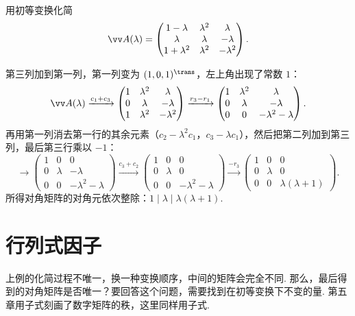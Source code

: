 	\begin{example}\label{eg:smithcalc}
		用初等变换化简
		\[\vv A(\lambda)=\begin{pmatrix}1-\lambda&\lambda^2&\lambda\\\lambda&\lambda&-\lambda\\1+\lambda^2&\lambda^2&-\lambda^2\end{pmatrix}.\]
	\end{example}
	\begin{solution}
		第三列加到第一列，第一列变为 $(1,0,1)^\trans$，左上角出现了常数 $1$：
		\[\vv A(\lambda)\xrightarrow{c_1+c_3}\begin{pmatrix}1&\lambda^2&\lambda\\0&\lambda&-\lambda\\1&\lambda^2&-\lambda^2\end{pmatrix}
		\xrightarrow{r_3-r_1}\begin{pmatrix}1&\lambda^2&\lambda\\0&\lambda&-\lambda\\0&0&-\lambda^2-\lambda\end{pmatrix}.\]
		再用第一列消去第一行的其余元素（$c_2-\lambda^2c_1$，$c_3-\lambda c_1$），然后把第二列加到第三列，最后第三行乘以 $-1$：
		\[\longrightarrow\begin{pmatrix}1&0&0\\0&\lambda&-\lambda\\0&0&-\lambda^2-\lambda\end{pmatrix}
		\xrightarrow{c_3+c_2}\begin{pmatrix}1&0&0\\0&\lambda&0\\0&0&-\lambda^2-\lambda\end{pmatrix}
		\xrightarrow{-r_3}\begin{pmatrix}1&0&0\\0&\lambda&0\\0&0&\lambda(\lambda+1)\end{pmatrix}.\]
		所得对角矩阵的对角元依次整除：$1\mid\lambda\mid\lambda(\lambda+1)$.
	\end{solution}
	
	\section{\hB 行列式因子}\label{sec:detfactor}
	
	上例的化简过程不唯一，换一种变换顺序，中间的矩阵会完全不同. 那么，最后得到的对角矩阵是否唯一？要回答这个问题，需要找到在初等变换下不变的量. 第五章用子式刻画了数字矩阵的秩，这里同样用子式.
	

